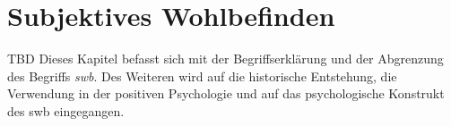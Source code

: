 %
%
\thispagestyle{empty}
\chapter{Subjektives Wohlbefinden}\label{chap.swb}
TBD\newline
Dieses Kapitel befasst sich mit der Begriffserklärung und der Abgrenzung des Begriffs \textit{\gls{swb}}. Des Weiteren wird auf die historische Entstehung, die Verwendung in der positiven Psychologie und auf das psychologische Konstrukt des \gls{swb} eingegangen.
